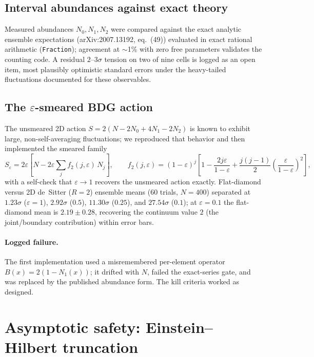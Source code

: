 \documentclass[11pt]{article}
\begin{document}
\subsection{Interval abundances against exact theory}
Measured abundances $N_0, N_1, N_2$ were compared against the exact analytic
ensemble expectations (arXiv:2007.13192, eq.~(49)) evaluated in exact rational
arithmetic (\texttt{Fraction}); agreement at $\sim$1\% with zero free
parameters validates the counting code. A residual $2$--$3\sigma$ tension on
two of nine cells is logged as an open item, most plausibly optimistic
standard errors under the heavy-tailed fluctuations documented for these
observables.

\subsection{The $\varepsilon$-smeared BDG action}
The unsmeared 2D action $S = 2(N - 2N_0 + 4N_1 - 2N_2)$ is known to exhibit
large, non-self-averaging fluctuations; we reproduced that behavior and then
implemented the smeared family
\[
  S_\varepsilon = 2\varepsilon\left[N - 2\varepsilon \sum_j f_2(j,\varepsilon)\, N_j\right],
  \qquad
  f_2(j,\varepsilon) = (1-\varepsilon)^j\left[1 - \frac{2j\varepsilon}{1-\varepsilon}
    + \frac{j(j-1)}{2}\left(\frac{\varepsilon}{1-\varepsilon}\right)^{\!2}\right],
\]
with a self-check that $\varepsilon \to 1$ recovers the unsmeared action
exactly. Flat-diamond versus 2D de~Sitter ($R{=}2$) ensemble means
(60 trials, $N{=}400$) separated at $1.23\sigma$ ($\varepsilon{=}1$),
$2.92\sigma$ ($0.5$), $11.30\sigma$ ($0.25$), and $27.54\sigma$ ($0.1$);
at $\varepsilon{=}0.1$ the flat-diamond mean is $2.19 \pm 0.28$, recovering
the continuum value $2$ (the joint/boundary contribution) within error bars.

\paragraph{Logged failure.} The first implementation used a misremembered
per-element operator $B(x) = 2(1 - N_1(x))$; it drifted with $N$, failed the
exact-series gate, and was replaced by the published abundance form. The kill
criteria worked as designed.

\section{Asymptotic safety: Einstein--Hilbert truncation}
\end{document}
